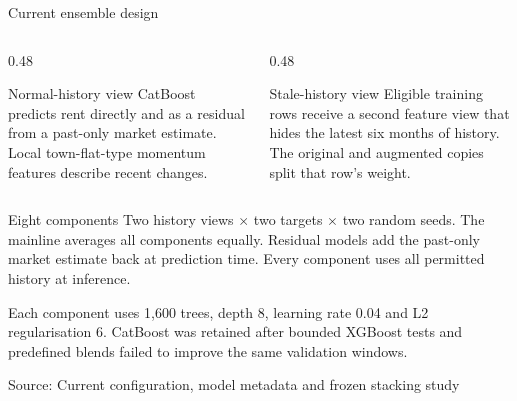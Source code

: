\documentclass[xcolor=dvipsnames,aspectratio=43]{beamer}
\newcommand{\source}[1]{%
  \vfill\par\begingroup\raggedright\tiny\color{gray}Source: #1\par\endgroup
}
\begin{document}
\begin{frame}{Current ensemble design}
\small
\begin{columns}[T,totalwidth=\textwidth]
  \begin{column}{0.48\textwidth}
    \begin{block}{Normal-history view}
      CatBoost predicts rent directly and as a residual from a past-only market estimate.
      Local town-flat-type momentum features describe recent changes.
    \end{block}
  \end{column}
  \begin{column}{0.48\textwidth}
    \begin{block}{Stale-history view}
      Eligible training rows receive a second feature view that hides the latest
      six months of history. The original and augmented copies split that row's weight.
    \end{block}
  \end{column}
\end{columns}
\vspace{0.25cm}
\begin{exampleblock}{Eight components}
  Two history views $\times$ two targets $\times$ two random seeds.
  The mainline averages all components equally. Residual models add the past-only
  market estimate back at prediction time. Every component uses all permitted history at inference.
\end{exampleblock}
Each component uses 1,600 trees, depth 8, learning rate 0.04 and L2 regularisation 6.
CatBoost was retained after bounded XGBoost tests and predefined blends failed to improve the same validation windows.
\source{Current configuration, model metadata and frozen stacking study}
\end{frame}
\end{document}
